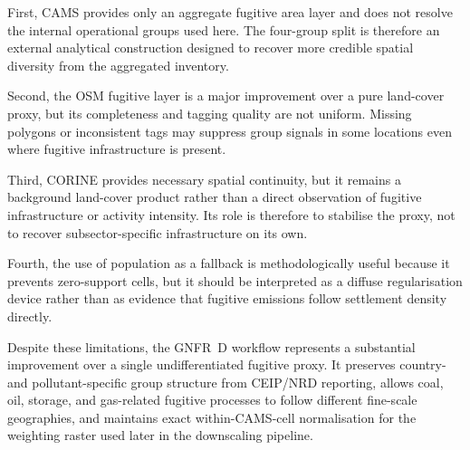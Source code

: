 First, CAMS provides only an aggregate fugitive area layer and does not
resolve the internal operational groups used here. The four-group split
is therefore an external analytical construction designed to recover more
credible spatial diversity from the aggregated inventory.

Second, the OSM fugitive layer is a major improvement over a pure
land-cover proxy, but its completeness and tagging quality are not
uniform. Missing polygons or inconsistent tags may suppress group
signals in some locations even where fugitive infrastructure is present.

Third, CORINE provides necessary spatial continuity, but it remains a
background land-cover product rather than a direct observation of
fugitive infrastructure or activity intensity. Its role is therefore to
stabilise the proxy, not to recover subsector-specific infrastructure on
its own.

Fourth, the use of population as a fallback is methodologically useful
because it prevents zero-support cells, but it should be interpreted as
a diffuse regularisation device rather than as evidence that fugitive
emissions follow settlement density directly.

Despite these limitations, the GNFR~D workflow represents a substantial
improvement over a single undifferentiated fugitive proxy. It preserves
country- and pollutant-specific group structure from CEIP/NRD reporting,
allows coal, oil, storage, and gas-related fugitive processes to follow
different fine-scale geographies, and maintains exact within-CAMS-cell
normalisation for the weighting raster used later in the downscaling
pipeline.
